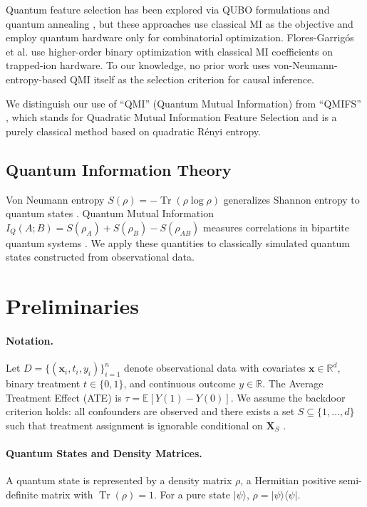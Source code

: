 \documentclass{svproc}
\newcommand{\QMI}{I_Q}
\newcommand{\vn}{S}
\begin{document}
Quantum feature selection has been explored via QUBO formulations \cite{mucke2023feature} and quantum annealing \cite{mummaneni2024miqubo}, but these approaches use classical MI as the objective and employ quantum hardware only for combinatorial optimization. Flores-Garrig\'{o}s et al. \cite{flores2026quantum} use higher-order binary optimization with classical MI coefficients on trapped-ion hardware. To our knowledge, no prior work uses von-Neumann-entropy-based QMI itself as the selection criterion for causal inference.

We distinguish our use of ``QMI'' (Quantum Mutual Information) from ``QMIFS'' \cite{vergara2017qmifs}, which stands for Quadratic Mutual Information Feature Selection and is a purely classical method based on quadratic R\'{e}nyi entropy.

\subsection{Quantum Information Theory}

Von Neumann entropy $\vn(\rho) = -\operatorname{Tr}(\rho \log \rho)$ generalizes Shannon entropy to quantum states \cite{nielsen2010quantum}. Quantum Mutual Information $\QMI(A;B) = \vn(\rho_A) + \vn(\rho_B) - \vn(\rho_{AB})$ measures correlations in bipartite quantum systems \cite{vedral2002role}. We apply these quantities to classically simulated quantum states constructed from observational data.

\section{Preliminaries}
\label{sec:prelim}

\paragraph{Notation.} Let $D = \{(\mathbf{x}_i, t_i, y_i)\}_{i=1}^n$ denote observational data with covariates $\mathbf{x} \in \mathbb{R}^d$, binary treatment $t \in \{0,1\}$, and continuous outcome $y \in \mathbb{R}$. The Average Treatment Effect (ATE) is $\tau = \mathbb{E}[Y(1) - Y(0)]$. We assume the backdoor criterion holds: all confounders are observed and there exists a set $S \subseteq \{1,\dots,d\}$ such that treatment assignment is ignorable conditional on $\mathbf{X}_S$ \cite{pearl2009causality,imbens2015causal}.

\paragraph{Quantum States and Density Matrices.} A quantum state is represented by a density matrix $\rho$, a Hermitian positive semi-definite matrix with $\operatorname{Tr}(\rho) = 1$. For a pure state $|\psi\rangle$, $\rho = |\psi\rangle\langle\psi|$.
\end{document}

